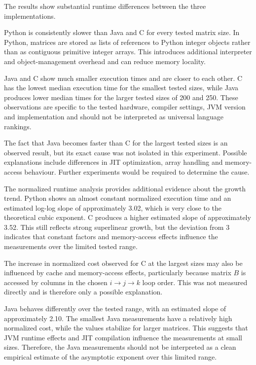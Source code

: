 \documentclass[11pt,a4paper]{article}
\begin{document}
The results show substantial runtime differences between the three implementations.

Python is consistently slower than Java and C for every tested matrix size. In Python, matrices are stored as lists of references to Python integer objects rather than as contiguous primitive integer arrays. This introduces additional interpreter and object-management overhead and can reduce memory locality.

Java and C show much smaller execution times and are closer to each other. C has the lowest median execution time for the smallest tested sizes, while Java produces lower median times for the larger tested sizes of 200 and 250. These observations are specific to the tested hardware, compiler settings, JVM version and implementation and should not be interpreted as universal language rankings.

The fact that Java becomes faster than C for the largest tested sizes is an observed result, but its exact cause was not isolated in this experiment. Possible explanations include differences in JIT optimization, array handling and memory-access behaviour. Further experiments would be required to determine the cause.

The normalized runtime analysis provides additional evidence about the growth trend. Python shows an almost constant normalized execution time and an estimated log-log slope of approximately 3.02, which is very close to the theoretical cubic exponent. C produces a higher estimated slope of approximately 3.52. This still reflects strong superlinear growth, but the deviation from 3 indicates that constant factors and memory-access effects influence the measurements over the limited tested range.

The increase in normalized cost observed for C at the largest sizes may also be influenced by cache and memory-access effects, particularly because matrix $B$ is accessed by columns in the chosen $i \rightarrow j \rightarrow k$ loop order. This was not measured directly and is therefore only a possible explanation.

Java behaves differently over the tested range, with an estimated slope of approximately 2.10. The smallest Java measurements have a relatively high normalized cost, while the values stabilize for larger matrices. This suggests that JVM runtime effects and JIT compilation influence the measurements at small sizes. Therefore, the Java measurements should not be interpreted as a clean empirical estimate of the asymptotic exponent over this limited range.
\end{document}
